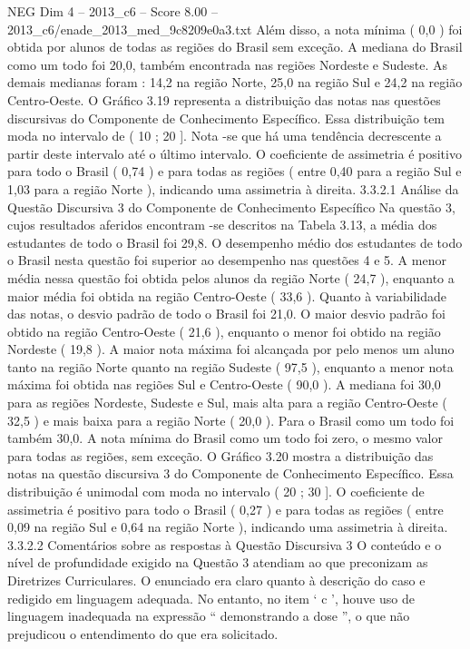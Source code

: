 \begin{textsample}{NEG Dim 4 – 2013\_c6 – Score 8.00 – 2013\_c6/enade\_2013\_med\_9c8209e0a3.txt}
Além disso, a nota mínima ( 0,0 ) foi obtida por alunos de todas as regiões do Brasil sem exceção.
A mediana do Brasil como um todo foi 20,0, também encontrada nas regiões Nordeste e Sudeste.
As demais medianas foram : 14,2 na região Norte, 25,0 na região Sul e 24,2 na região Centro-Oeste.
O Gráfico 3.19 representa a distribuição das notas nas questões discursivas do Componente de Conhecimento Específico.
Essa distribuição tem moda no intervalo de ( 10 ; 20 ].
Nota -se que há uma tendência decrescente a partir deste intervalo até o último intervalo.
O coeficiente de assimetria é positivo para todo o Brasil ( 0,74 ) e para todas as regiões ( entre 0,40 para a região Sul e 1,03 para a região Norte ), indicando uma assimetria à direita. 3.3.2.1 Análise da Questão Discursiva 3 do Componente de Conhecimento Específico Na questão 3, cujos resultados aferidos encontram -se descritos na Tabela 3.13, a média dos estudantes de todo o Brasil foi 29,8.
O desempenho médio dos estudantes de todo o Brasil nesta questão foi superior ao desempenho nas questões 4 e 5.
A menor média nessa questão foi obtida pelos alunos da região Norte ( 24,7 ), enquanto a maior média foi obtida na região Centro-Oeste ( 33,6 ).
Quanto à variabilidade das notas, o desvio padrão de todo o Brasil foi 21,0.
O maior desvio padrão foi obtido na região Centro-Oeste ( 21,6 ), enquanto o menor foi obtido na região Nordeste ( 19,8 ).
A maior nota máxima foi alcançada por pelo menos um aluno tanto na região Norte quanto na região Sudeste ( 97,5 ), enquanto a menor nota máxima foi obtida nas regiões Sul e Centro-Oeste ( 90,0 ).
A mediana foi 30,0 para as regiões Nordeste, Sudeste e Sul, mais alta para a região Centro-Oeste ( 32,5 ) e mais baixa para a região Norte ( 20,0 ).
Para o Brasil como um todo foi também 30,0.
A nota mínima do Brasil como um todo foi zero, o mesmo valor para todas as regiões, sem exceção.
O Gráfico 3.20 mostra a distribuição das notas na questão discursiva 3 do Componente de Conhecimento Específico.
Essa distribuição é unimodal com moda no intervalo ( 20 ; 30 ].
O coeficiente de assimetria é positivo para todo o Brasil ( 0,27 ) e para todas as regiões ( entre 0,09 na região Sul e 0,64 na região Norte ), indicando uma assimetria à direita. 3.3.2.2 Comentários sobre as respostas à Questão Discursiva 3 O conteúdo e o nível de profundidade exigido na Questão 3 atendiam ao que preconizam as Diretrizes Curriculares.
O enunciado era claro quanto à descrição do caso e redigido em linguagem adequada.
No entanto, no item ‘ c ’, houve uso de linguagem inadequada na expressão “ demonstrando a dose ”, o que não prejudicou o entendimento do que era solicitado.

\end{textsample}
